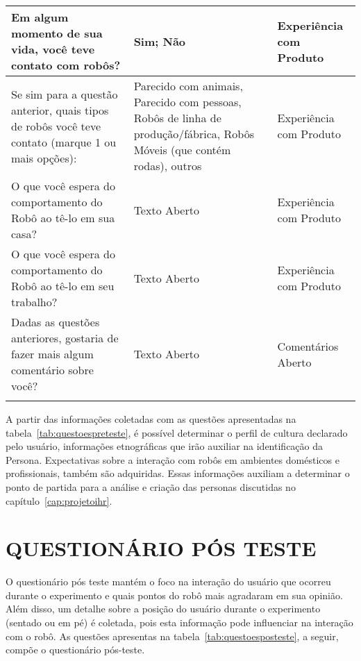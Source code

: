 \begin{longtable}{ m{7 cm} | m{4cm} | m{4cm} }
	Em algum momento de sua vida, você teve contato com robôs? & Sim; Não & Experiência com Produto \\ \hline
	Se sim para a questão anterior, quais tipos de robôs você teve contato (marque 1 ou mais opções): & Parecido com animais, Parecido com pessoas, Robôs de linha de produção/fábrica, Robôs Móveis (que contém rodas), outros  & Experiência com Produto \\ \hline
	O que você espera do comportamento do Robô ao tê-lo em sua casa? & Texto Aberto & Experiência com Produto \\ \hline
	O que você espera do comportamento do Robô ao tê-lo em seu trabalho? & Texto Aberto & Experiência com Produto \\ \hline
	Dadas as questões anteriores, gostaria de fazer mais algum comentário sobre você? & Texto Aberto & Comentários Aberto \\ \hline
	\smallcaption{Fonte: O autor.}
\end{longtable}

A partir das informações coletadas com as questões apresentadas na tabela~\ref{tab:questoespreteste}, é possível determinar o perfil de cultura declarado pelo usuário, informações etnográficas que irão auxiliar na identificação da Persona. Expectativas sobre a interação com robôs em ambientes domésticos e profissionais, também são adquiridas. Essas informações auxiliam a determinar o ponto de partida para a análise e criação das personas discutidas no capítulo~\ref{cap:projetoihr}.

\section{QUESTIONÁRIO PÓS TESTE}
\label{sec:questionarioposteste}
O questionário pós teste mantém o foco na interação do usuário que ocorreu durante o experimento e quais pontos do robô mais agradaram em sua opinião. Além disso, um detalhe sobre a posição do usuário durante o experimento (sentado ou em pé) é coletada, pois esta informação pode influenciar na interação com o robô. As questões apresentas na tabela~\ref{tab:questoesposteste}, a seguir, compõe o questionário pós-teste.

